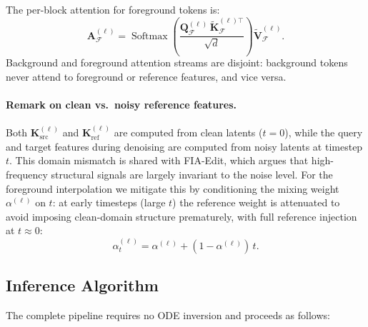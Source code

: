 The per-block attention for foreground tokens is:
\begin{equation}
    \mathbf{A}_{\mathcal{F}}^{(\ell)}
        = \operatorname{Softmax}\!\!\left(
              \frac{\mathbf{Q}_{\mathcal{F}}^{(\ell)}\,
                    \tilde{\mathbf{K}}_{\mathcal{F}}^{(\ell)\top}}{\sqrt{d}}
          \right)\tilde{\mathbf{V}}_{\mathcal{F}}^{(\ell)}.
    \label{eq:fg_attn}
\end{equation}
Background and foreground attention streams are disjoint: background tokens never attend
to foreground or reference features, and vice versa.

\paragraph{Remark on clean vs.\ noisy reference features.}
Both $\mathbf{K}_{\mathrm{src}}^{(\ell)}$ and $\mathbf{K}_{\mathrm{ref}}^{(\ell)}$ are
computed from clean latents ($t=0$), while the query and target features during denoising
are computed from noisy latents at timestep $t$.
This domain mismatch is shared with FIA-Edit, which argues that high-frequency structural
signals are largely invariant to the noise level.
For the foreground interpolation we mitigate this by conditioning the mixing weight
$\alpha^{(\ell)}$ on $t$: at early timesteps (large $t$) the reference weight is
attenuated to avoid imposing clean-domain structure prematurely, with full reference
injection at $t \approx 0$:
\begin{equation}
    \alpha^{(\ell)}_t = \alpha^{(\ell)} + (1 - \alpha^{(\ell)})\,t.
    \label{eq:time_schedule}
\end{equation}

\subsection{Inference Algorithm}

The complete pipeline requires no ODE inversion and proceeds as follows:

